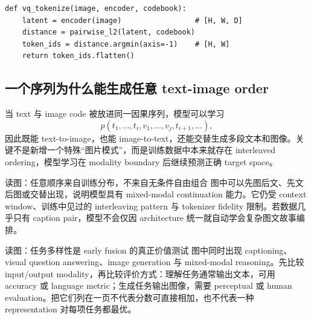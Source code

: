 \begin{lstlisting}[caption={VQ 图像 tokenization 的最小伪代码}]
def vq_tokenize(image, encoder, codebook):
    latent = encoder(image)                 # [H, W, D]
    distance = pairwise_l2(latent, codebook)
    token_ids = distance.argmin(axis=-1)    # [H, W]
    return token_ids.flatten()
\end{lstlisting}


\subsection{一个序列为什么能生成任意 text-image order}

当 text 与 image code 被放进同一因果序列，模型可以学习
$$
p(t_1,\ldots,t_i,v_1,\ldots,v_j,t_{i+1},\ldots),
$$
因此既能 text-to-image，也能 image-to-text，还能交替生成多段文本和图像。关键不是新增一个特殊“图片模式”，而是训练数据中本来就存在 interleaved ordering，模型学习在 modality boundary 后继续预测正确 target space。


\begin{knowledgebox}{读图：任意顺序来自训练分布，不来自无条件自由组合}
图中可以先图后文、先文后图或交替出现，说明模型具有 mixed-modal continuation 能力。它仍受 context window、训练中见过的 interleaving pattern 与 tokenizer fidelity 限制。若数据几乎只有 caption pair，模型不会仅因 architecture 统一就自动学会复杂图文故事编排。
\end{knowledgebox}


\begin{knowledgebox}{读图：任务多样性是 early fusion 的真正价值测试}
图中同时出现 captioning、visual question answering、image generation 与 mixed-modal reasoning。先比较 input/output modality，再比较评价方式：理解任务通常输出文本，可用 accuracy 或 language metric；生成任务输出图像，需要 perceptual 或 human evaluation。把它们列在一页不代表分数可直接相加，也不代表一种 representation 对每项任务都最优。
\end{knowledgebox}

